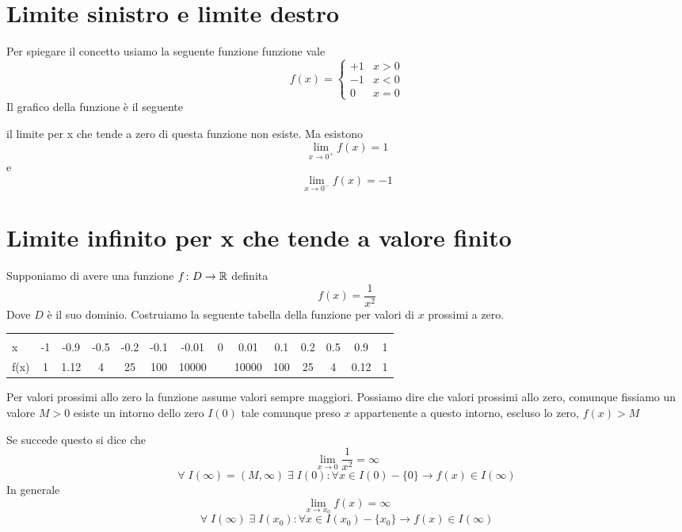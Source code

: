  \section{Limite sinistro e limite destro}
 Per spiegare il concetto usiamo la seguente funzione funzione vale \[ f(x)=\begin{cases}
 +1&x>0\\
 -1&x<0\\
 0&x=0
 \end{cases}\]
 Il grafico della funzione è il seguente
  \begin{center}
 	
 \end{center}
il limite per  x che tende a zero di questa funzione non esiste. Ma esistono \[\lim_{x\to 0^+}f(x)=1 \]
e \[\lim_{x\to 0^-}f(x)=-1 \]
\section{Limite infinito per x che tende a valore finito}
Supponiamo di avere una funzione $f\colon D\to{}\mathbb{R}$ definita \[f(x)=\dfrac{1}{x^2}\]Dove $D$ è il suo dominio. Costruiamo la seguente tabella della funzione per valori di $x$ prossimi a zero.
\begin{center}
	\begin{tabular}{@{}L*{13}{c}}
		\toprule
		&&&&&	&&\\
		x& -1 & -0.9 & -0.5&-0.2&-0.1&-0.01&0&0.01&0.1&0.2&0.5&0.9&1 \\
		\cmidrule(r){2-14} 
	f(x)	&1&1.12&4&25&100&10000&&10000&100&25&4&0.12&1\\
		\bottomrule
	\end{tabular}
\end{center}
Per valori prossimi allo zero la funzione assume valori sempre maggiori. Possiamo dire che valori prossimi allo zero, comunque fissiamo un valore $M>0$ esiste un intorno dello zero $I(0)$ tale comunque preso $x$ appartenente a questo intorno, escluso lo zero, $f(x)>M$

Se succede questo si dice che \[\lim_{x\to 0}\dfrac{1}{x^2}=\infty \]
\begin{equation*}
\forall\; I(\infty)=(M,\infty)\; \exists\; I(0) : \forall x\in I(0)-\lbrace 0\rbrace \longrightarrow f(x)\in I(\infty)
\end{equation*}
In generale \begin{equation*}
\lim_{x\to x_0}f(x)=\infty
\end{equation*}
\begin{equation*}
\forall\; I(\infty)\; \exists\; I(x_0) : \forall x\in I(x_0)-\lbrace x_0\rbrace \longrightarrow f(x)\in I(\infty)
\end{equation*}
